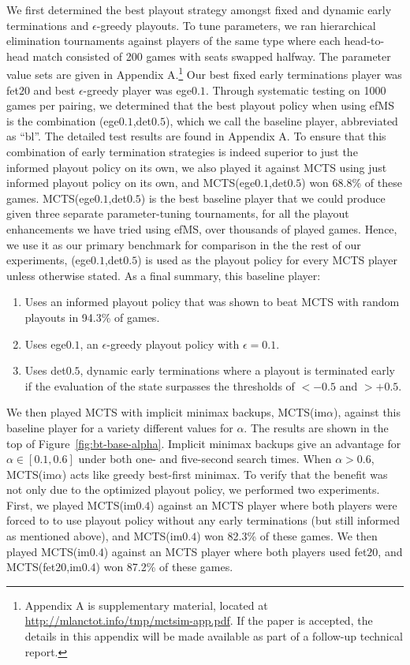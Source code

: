 \documentclass[conference]{IEEEtran}
\begin{document}
We first determined the best playout strategy amongst fixed and dynamic early 
terminations and $\epsilon$-greedy playouts.
To tune parameters, we ran hierarchical elimination tournaments against players of the same type 
where each head-to-head match consisted of 200 games with seats swapped halfway. 
The parameter value sets are given in Appendix A.\footnote{Appendix A is supplementary material, located 
at \url{http://mlanctot.info/tmp/mctsim-app.pdf}. If the paper is accepted, the details in this appendix 
will be made available as part of a follow-up technical report.}
Our best fixed early terminations player was fet$20$ and best $\epsilon$-greedy player was ege$0.1$.
Through systematic testing on 1000 games per pairing, we determined that the best playout 
policy when using efMS is the combination (ege$0.1$,det$0.5$), which 
we call the baseline player, abbreviated as ``bl''. The detailed test results are found in Appendix A.
To ensure that this combination of early termination strategies is indeed superior to just the informed 
playout policy on its own, we also played it against MCTS using just informed playout policy on its own, 
and MCTS(ege$0.1$,det$0.5$) won 68.8\% of these games.
MCTS(ege$0.1$,det$0.5$) is the best baseline
player that we could produce given three separate parameter-tuning tournaments, for all the playout enhancements 
we have tried using efMS, over thousands of played games. Hence, we 
use it as our primary benchmark for comparison in the the rest of our experiments, (ege$0.1$,det$0.5$) is 
used as the playout policy for every MCTS player unless otherwise stated.
As a final summary, this baseline player:
\begin{enumerate}
\item Uses an informed playout policy that was shown to beat MCTS with random playouts in 94.3\% of games.
\item Uses ege$0.1$, an $\epsilon$-greedy playout policy with $\epsilon = 0.1$.
\item Uses det$0.5$, dynamic early terminations where a playout is terminated early if the evaluation 
      of the state surpasses the thresholds of $<-0.5$ and $>+0.5$.
\end{enumerate}


We then played MCTS with implicit minimax backups, MCTS(im$\alpha$), against this baseline player for a 
variety different values for $\alpha$. The results are shown in the top of Figure~\ref{fig:bt-base-alpha}.
Implicit minimax backups give an advantage for $\alpha \in [0.1,0.6]$ under both one- and five-second 
search times. 
When $\alpha > 0.6$, MCTS(im$\alpha$) acts like greedy best-first minimax.
To verify that the benefit was not only due to the optimized playout policy, we performed two experiments. 
First, we played MCTS(im$0.4$) against an MCTS player where both players were forced to to use playout policy 
without any early terminations (but still informed as mentioned above), and MCTS(im$0.4$) won 82.3\% of these games. 
We then played MCTS(im$0.4$) against an MCTS player where both players used fet$20$, and
MCTS(fet$20$,im$0.4$) won 87.2\% of these games.
\end{document}
